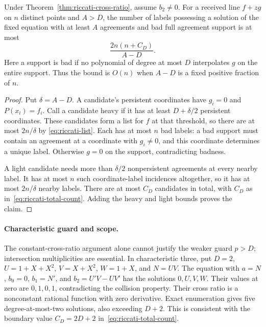 \begin{corollary}
\label{cor:riccati-fixed-mca}
Under Theorem~\ref{thm:riccati-cross-ratio}, assume $b_2\ne0$.
For a received line $f+zg$ on $n$ distinct points and $A>D$, the
number of labels possessing a solution of the fixed equation with
at least $A$ agreements and bad full agreement support is at most
\begin{equation}
 \frac{2n(n+C_D)}{A-D}.
 \label{eq:riccati-fixed-mca}
\end{equation}
Here a support is bad if no polynomial of degree at most $D$
interpolates $g$ on the entire support. Thus the bound is $O(n)$
when $A-D$ is a fixed positive fraction of $n$.
\end{corollary}
\begin{proof}
Put $\delta=A-D$. A candidate's persistent coordinates have
$g_i=0$ and $P(x_i)=f_i$. Call a candidate heavy if it has at least
$D+\delta/2$ persistent coordinates. These candidates form a list
for $f$ at that threshold, so there are at most $2n/\delta$ by
\eqref{eq:riccati-list}. Each has at most $n$ bad labels: a bad
support must contain an agreement at a coordinate with $g_i\ne0$,
and this coordinate determines a unique label. Otherwise $g=0$
on the support, contradicting badness.

A light candidate needs more than $\delta/2$ nonpersistent
agreements at every nearby label. It has at most $n$ such
coordinate-label incidences altogether, so it has at most
$2n/\delta$ nearby labels. There are at most $C_D$ candidates in
total, with $C_D$ as in~\eqref{eq:riccati-total-count}. Adding the heavy and light bounds proves the claim.
\end{proof}

\paragraph{Characteristic guard and scope.}
The constant-cross-ratio argument alone cannot justify the weaker
guard $p>D$; intersection multiplicities are essential. In characteristic three,
put $D=2$, $U=1+X+X^2$, $V=X+X^2$, $W=1+X$, and $N=UV$.
The equation with $a=N$, $b_0=0$, $b_1=N'$, and
$b_2=U'V-UV'$ has the solutions $0,U,V,W$. Their values at zero
are $0,1,0,1$, contradicting the collision property. Their cross
ratio is a nonconstant rational function with zero derivative.
Exact enumeration gives five degree-at-most-two solutions, also
exceeding $D+2$. This is consistent with the boundary value
$C_D=2D+2$ in~\eqref{eq:riccati-total-count}.

